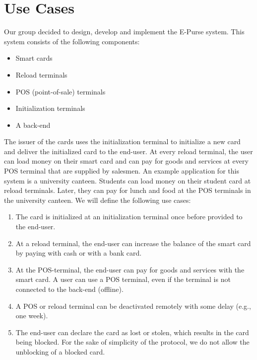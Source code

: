 


\maketitle



\section{Use Cases}
Our group decided to design, develop and implement the E-Purse system.
This system consists of the following components:
\begin{itemize}
    \item Smart cards
    \item Reload terminals
    \item POS (point-of-sale) terminals
    \item Initialization terminals
    \item A back-end
\end{itemize}
The issuer of the cards uses the initialization terminal to initialize a new card and deliver the initialized card to the end-user.
At every reload terminal, the user can load money on their smart card and can pay for goods and services at every POS terminal that are supplied by salesmen.
An example application for this system is a university canteen.
Students can load money on their student card at reload terminals.
Later, they can pay for lunch and food at the POS terminals in the university canteen.
We will define the following use cases:
\begin{enumerate}[label={UC\arabic*:}, ref={UC\arabic*}, leftmargin=3\parindent]
    \item \label{uc:person} The card is initialized at an initialization terminal once before provided to the end-user.
    
    \item \label{uc:reload} At a reload terminal, the end-user can increase the balance of the smart card by paying with cash or with a bank card.
    
    \item \label{uc:payment} At the POS-terminal, the end-user can pay for goods and services with the smart card.
    A user can use a POS terminal, even if the terminal is not connected to the back-end (offline).

    \item A POS or reload terminal can be deactivated remotely with some delay (e.g., one week).
    
    \item The end-user can declare the card as lost or stolen, which results in the card being blocked.
    For the sake of simplicity of the protocol, we do not allow the unblocking of a blocked card.
    
\end{enumerate}
